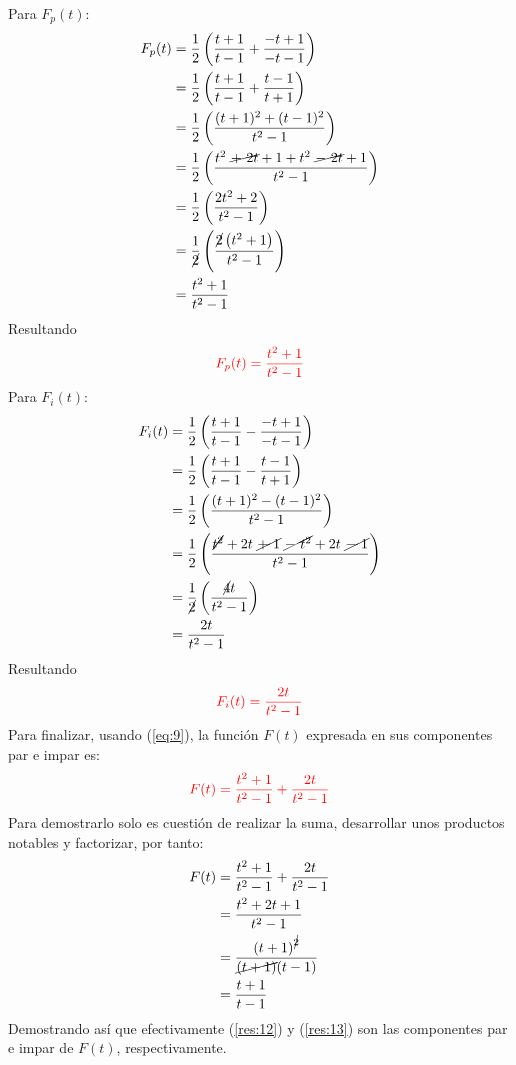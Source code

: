 \begin{multicols}{2}
Para $F_p(t)$:
\begin{align*}
    F_p(t) &= \frac{1}{2} \left(\frac{t+1}{t-1} + \frac{-t+1}{-t-1}\right)\\
    &= \frac{1}{2} \left(\frac{t+1}{t-1} + \frac{t-1}{t+1}\right)\\
    &= \frac{1}{2} \left(\frac{(t+1)^{2} + (t-1)^{2}}{t^{2} - 1}\right)\\
    &= \frac{1}{2} \left(\frac{t^{2}~ \cancel{+~2t} + 1 + t^{2}~ \cancel{-~2t} + 1}{t^{2} - 1}\right)\\
    &= \frac{1}{2} \left(\frac{2t^{2} + 2}{t^{2} - 1}\right)\\
    &= \frac{1}{\cancel{2}} \left(\frac{\cancel{2}\left(t^{2} + 1\right)}{t^{2} - 1}\right)\\
    &= \frac{t^{2} + 1}{t^2 - 1}
\end{align*}
Resultando
\begin{equation}
    \textcolor{rojo}{F_p(t) = \frac{t^{2} + 1}{t^2 - 1}}
    \label{res:12}
\end{equation}
Para $F_i(t)$:
\begin{align*}
    F_i(t) &= \frac{1}{2} \left(\frac{t+1}{t-1} - \frac{-t+1}{-t-1}\right)\\
    &= \frac{1}{2} \left(\frac{t+1}{t-1} - \frac{t-1}{t+1}\right)\\
    &= \frac{1}{2} \left(\frac{(t+1)^{2} - (t-1)^{2}}{t^{2} - 1}\right)\\
    &= \frac{1}{2} \left(\frac{\cancel{t^{2}} + 2t~ \cancel{+~1}~ \cancel{-~t^{2}} + 2t~ \cancel{-~1}}{t^{2} - 1}\right)\\
    &= \frac{1}{\cancel{2}} \left(\frac{\cancel{4}t}{t^{2} - 1}\right)\\
    &= \frac{2t}{t^{2} - 1}
\end{align*}
Resultando
\begin{equation}
    \textcolor{rojo}{F_i(t) = \frac{2t}{t^{2} - 1}}
    \label{res:13}
\end{equation}
Para finalizar, usando (\ref{eq:9}), la función $F(t)$ expresada en sus componentes par e impar es:
\begin{equation}
    \textcolor{rojo}{F(t) = \frac{t^{2} + 1}{t^2 - 1} + \frac{2t}{t^{2} - 1}}
    \label{res:14}
\end{equation}
Para demostrarlo solo es cuestión de realizar la suma, desarrollar unos productos notables y factorizar, por tanto:
\begin{align*}
    F(t) &= \frac{t^{2} + 1}{t^{2} - 1} + \frac{2t}{t^{2} - 1}\\
    &= \frac{t^{2} + 2t + 1}{t^{2} - 1}\\
    &= \frac{\left(t + 1\right)^{\cancel{2}}}{\cancel{(t + 1)}(t - 1)}\\
    &= \frac{t + 1}{t - 1}
\end{align*}
Demostrando así que efectivamente (\ref{res:12}) y (\ref{res:13}) son las componentes par e impar de $F(t)$, respectivamente.


\end{multicols}
